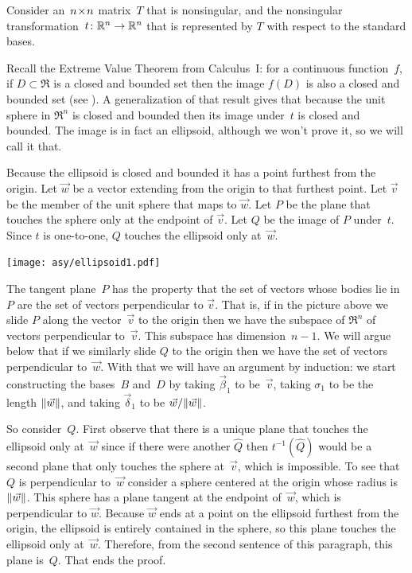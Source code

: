 Consider an~$n \! \times \! n$ matrix~$T$ that is nonsingular, and the
nonsingular transformation~$\mbox{$t\colon \mathbb{R}^n\to \mathbb{R}^n$}$ that is represented by
$T$ with respect to the standard bases.

Recall the Extreme Value Theorem from Calculus~I: for a continuous
function~$f$, if $D\subset \Re$ is a closed and bounded set then
the image $f(D)$ is also a closed and bounded 
set (see \cite{wiki:ExtremeValueThm}).
A generalization of that result gives that because the unit sphere in $\Re^n$
is closed and bounded then its image under~$t$ is closed and bounded.
The image is in fact an ellipsoid, although we won't prove it,
so we will call it that. 

Because the ellipsoid is closed and bounded it has a point furthest from the
origin.
Let $\vec{w}$ be a vector extending from the origin to that furthest point.
Let $\vec{v}$ be the member of the unit sphere that maps to $\vec{w}$.
Let $P$ be the plane that touches the sphere only at the endpoint of $\vec{v}$.
Let $Q$ be the image of $P$ under~$t$.
Since $t$ is one-to-one, $Q$ touches the ellipsoid only at~$\vec{w}$.
\begin{center}
  \texttt{[image: asy/ellipsoid1.pdf]}
\end{center}

The tangent plane~$P$ has the property that 
the set of vectors whose bodies lie in~$P$
are the set of vectors perpendicular to $\vec{v}$.
That is, if in the picture above we slide $P$ along the vector~$\vec{v}$ to
the origin then we have the subspace of $\Re^n$ of vectors perpendicular
to~$\vec{v}$.
This subspace has dimension~$n-1$. 
We will argue below 
that if we similarly slide $Q$ to the origin then we have the
set of vectors perpendicular to~$\vec{w}$.
With that we will have an argument by induction: we start constructing the 
bases~$B$ and~$D$ by taking $\vec{\beta}_1$ to be~$\vec{v}$, taking
$\sigma_1$ to be the length $\|\vec{w}\|$, and taking
$\vec{\delta}_1$ to be $\vec{w}/\|\vec{w}\|$.

So consider~$Q$.
First observe that there is a unique plane that touches the ellipsoid
only at~$\vec{w}$ since if there were another $\hat{Q}$ then $t^{-1}(\hat{Q})$
would be a second plane that only touches the sphere at~$\vec{v}$, which is
impossible.
To see that $Q$ is perpendicular to~$\vec{w}$ consider a sphere
centered at the origin whose radius is $\|\vec{w}\|$.
This sphere has a plane tangent at the endpoint of~$\vec{w}$, 
which is perpendicular
to $\vec{w}$.
Because $\vec{w}$ ends at a point on the ellipsoid furthest from the origin,
the ellipsoid is entirely contained in the sphere, so this plane touches
the ellipsoid only at~$\vec{w}$.
Therefore, from the second sentence of this paragraph, this plane is~$Q$. 
That ends the proof.



